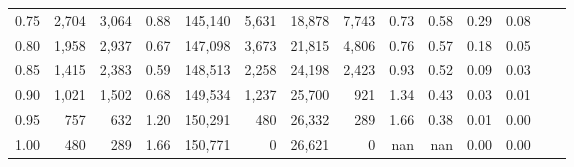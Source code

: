 \begin{tabular}{rrrrrrrrrrrrrr}
0.75 &   2,704 &  3,064 &    0.88 &  145,140 &    5,631 &  18,878 &   7,743 &  0.73 &  0.58 &  0.29 &      0.08 \\
0.80 &   1,958 &  2,937 &    0.67 &  147,098 &    3,673 &  21,815 &   4,806 &  0.76 &  0.57 &  0.18 &      0.05 \\
0.85 &   1,415 &  2,383 &    0.59 &  148,513 &    2,258 &  24,198 &   2,423 &  0.93 &  0.52 &  0.09 &      0.03 \\
0.90 &   1,021 &  1,502 &    0.68 &  149,534 &    1,237 &  25,700 &     921 &  1.34 &  0.43 &  0.03 &      0.01 \\
0.95 &     757 &    632 &    1.20 &  150,291 &      480 &  26,332 &     289 &  1.66 &  0.38 &  0.01 &      0.00 \\
1.00 &     480 &    289 &    1.66 &  150,771 &        0 &  26,621 &       0 &   nan &   nan &  0.00 &      0.00 \\
\bottomrule
\end{tabular}
